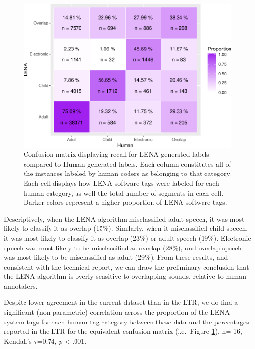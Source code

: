 \documentclass[man,floatsintext]{apa6}
\theoremstyle{definition}
\theoremstyle{definition}
\theoremstyle{definition}
\theoremstyle{remark}
\begin{document}
\begin{figure}
\centering
\includegraphics{LTR_manuscript_files/figure-latex/comp-matrix-plot-1.pdf}
\caption{\label{fig:comp-matrix-plot}Confusion matrix displaying recall for
LENA-generated labels compared to Human-generated labels. Each column
constitutes all of the instances labeled by human coders as belonging to
that category. Each cell displays how LENA software tags were labeled
for each human category, as well the total number of segments in each
cell. Darker colors represent a higher proportion of LENA software
tags.}
\end{figure}

Descriptively, when the LENA algorithm misclassified adult speech, it
was most likely to classify it as overlap (15\%). Similarly, when it
misclassified child speech, it was most likely to classify it as overlap
(23\%) or adult speech (19\%). Electronic speech was most likely to be
misclassified as overlap (28\%), and overlap speech was most likely to
be misclassified as adult (29\%). From these results, and consistent
with the technical report, we can draw the preliminary conclusion that
the LENA algorithm is overly sensitive to overlapping sounds, relative
to human annotaters.

Despite lower agreement in the current dataset than in the LTR, we do
find a significant (non-parametric) correlation across the proportion of
the LENA system tags for each human tag category between these data and
the percentages reported in the LTR for the equivalent confusion matrix
(i.e.~Figure \ref{fig:comp-matrix-plot}), n= 16, Kendall's
\(\tau\)=0.74, \emph{p} \textless{} .001.
\end{document}
